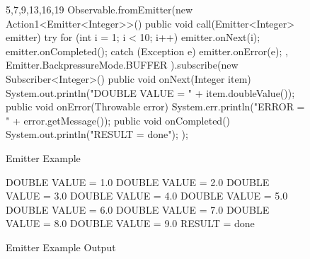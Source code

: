 \begin{figure}[H]
\begin{minipage}{0.65\textwidth}
\begin{sourcecode}
\begin{javacode}{5,7,9,13,16,19}
Observable.fromEmitter(new Action1<Emitter<Integer>>() {
    public void call(Emitter<Integer> emitter) {
        try {
            for (int i = 1; i < 10; i++) {
                emitter.onNext(i);
            }
            emitter.onCompleted();
        } catch (Exception e) {
            emitter.onError(e);
        }
    }
}, Emitter.BackpressureMode.BUFFER ).subscribe(new Subscriber<Integer>() {
    public void onNext(Integer item) {
        System.out.println("DOUBLE VALUE = " + item.doubleValue());
    }
    public void onError(Throwable error) {
        System.err.println("ERROR = " + error.getMessage());
    }
    public void onCompleted() {
        System.out.println("RESULT = done");
    }
});
\end{javacode}
\caption{Emitter Example}
\label{code:emitter-example}
\end{sourcecode}
\end{minipage}\hspace{0.7cm}
\begin{minipage}{0.30\textwidth}
\begin{sourcecode}
\begin{javacode}{}
DOUBLE VALUE = 1.0
DOUBLE VALUE = 2.0
DOUBLE VALUE = 3.0
DOUBLE VALUE = 4.0
DOUBLE VALUE = 5.0
DOUBLE VALUE = 6.0
DOUBLE VALUE = 7.0
DOUBLE VALUE = 8.0
DOUBLE VALUE = 9.0
RESULT = done
\end{javacode}
\caption{Emitter Example Output}
\label{code:emitter-example-output}
\end{sourcecode}
\end{minipage}
\end{figure}